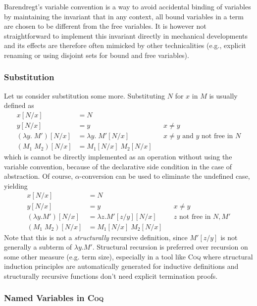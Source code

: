 \documentclass[a4paper,11pt]{article}
\newcommand{\name}[1]{\textsc{#1}\xspace}
\def\Coq{\name{Coq}}
\begin{document}
Barendregt's variable convention is a way to avoid accidental binding of
variables by maintaining the invariant that in any context, all bound
variables in a term are chosen to be different from the free variables.
It is however not straightforward to implement this invariant directly in
mechanical developments and its effects are therefore often mimicked
by other technicalities (e.g., explicit renaming or using disjoint
sets for bound and free variables).

\subsubsection*{Substitution}

Let us consider substitution some more.
Substituting $N$ for $x$ in $M$ is usually defined as
\begin{align*}
  x[N/x]                 &= N\\
  y[N/x]                 &= y                      && \text{$x \neq y$} \\
  (\lambda y.\; M')[N/x] &= \lambda y. \; M'[N/x]  && \text{$x \neq y$ and $y$ not free in $N$} \\
  (M_1 \; M_2)[N/x]      &= M_1[N/x] \; M_2[N/x]
\end{align*}
which is cannot be directly implemented as an operation without using the
variable convention, because of the declarative side condition in the
case of abstraction.
Of course, $\alpha$-conversion can be used to eliminate the undefined
case, yielding
\begin{align*}
  x[N/x]              &= N\\
  y[N/x]              &= y                       && \text{$x \neq y$} \\
  (\lambda y.M')[N/x] &= \lambda z.M'[z/y][N/x]  && \text{$z$ not free in $N\!, M'$} \\
  (M_1 \; M_2)[N/x]   &= M_1[N/x] \; M_2[N/x]
\end{align*}
Note that this is not a {\em structurally} recursive definition, since
$M'[z/y]$ is not generally a subterm of $\lambda y.M'$.
Structural recursion is preferred over recursion on some other measure
(e.g. term size), especially in a tool like \Coq where structural
induction principles are automatically generated for inductive
definitions and structurally recursive functions don't need explicit
termination proofs.

\subsubsection*{Named Variables in \Coq}
\end{document}
